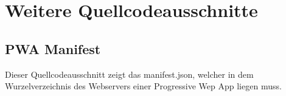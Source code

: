 \chapter{Weitere Quellcodeausschnitte}
\label{chap:weiterequellcodeausschnitte}

\section*{PWA Manifest}
Dieser Quellcodeausschnitt zeigt das manifest.json, welcher in dem Wurzelverzeichnis
des Webservers einer Progressive Wep App liegen muss.
\inputminted{jsx}{snippets/json/manifest.json}
